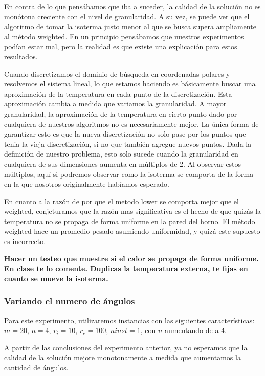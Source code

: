 En contra de lo que pensábamos que iba a suceder, la calidad de la solución no es monótona creciente con el nivel de granularidad. A su vez, se puede ver que el algoritmo de tomar la isoterma justo menor al que se busca supera ampliamente al método weighted. En un principio pensábamos que nuestros experimentos podían estar mal, pero la realidad es que existe una explicación para estos resultados.

Cuando discretizamos el dominio de búsqueda en coordenadas polares y resolvemos el sistema lineal, lo que estamos haciendo es básicamente buscar una aproximación de la temperatura en cada punto de la discretización. Esta aproximación cambia a medida que variamos la granularidad. A mayor granularidad, la aproximación de la temperatura en cierto punto dado por cualquiera de nuestros algoritmos no es necesariamente mejor. La única forma de garantizar esto es que la nueva discretización no solo pase por los puntos que tenia la vieja discretización, si no que también agregue nuevos puntos. Dada la definición de nuestro problema, esto solo sucede cuando la granularidad en cualquiera de sus dimensiones aumenta en múltiplos de 2. Al observar estos múltiplos, aquí si podremos observar como la isoterma se comporta de la forma en la que nosotros originalmente habíamos esperado.

En cuanto a la razón de por que el metodo lower se comporta mejor que el weighted, conjeturamos que la razón mas significativa es el hecho de que quizás la temperatura no se propaga de forma uniforme en la pared del horno. El método weighted hace un promedio pesado asumiendo uniformidad, y quizá este supuesto es incorrecto.

\textbf{Hacer un testeo que muestre si el calor se propaga de forma uniforme. En clase te lo comente. Duplicas la temperatura externa, te fijas en cuanto se mueve la isoterma.}

\pagebreak

\subsubsection{Variando el numero de ángulos}

Para este experimento, utilizaremos instancias con las siguientes características: $m = 20$, $n = 4$, $r_i = 10$, $r_e = 100$, $ninst = 1$, con $n$ aumentando de a 4.

A partir de las conclusiones del experimento anterior, ya no esperamos que la calidad de la solución mejore monotonamente a medida que aumentamos la cantidad de ángulos.

